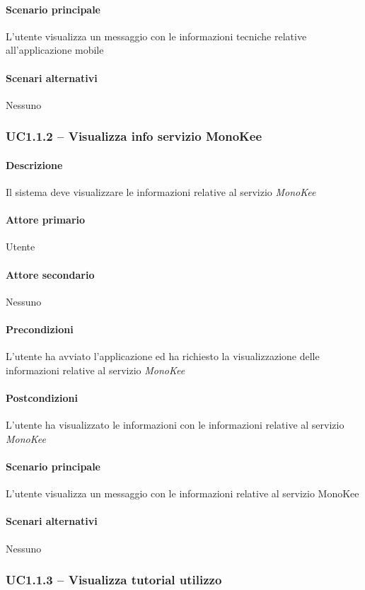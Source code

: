 \paragraph{Scenario principale}  
L’utente visualizza un messaggio con le informazioni tecniche relative all’applicazione mobile
\paragraph{Scenari alternativi}  Nessuno


\subsubsection{UC1.1.2 – Visualizza info servizio MonoKee}
\paragraph{Descrizione}  Il sistema deve visualizzare le informazioni relative al servizio \textit{MonoKee}
\paragraph{Attore primario}  Utente
\paragraph{Attore secondario}  Nessuno
\paragraph{Precondizioni}  L’utente ha avviato l’applicazione ed ha richiesto la visualizzazione delle informazioni relative al servizio \textit{MonoKee}
\paragraph{Postcondizioni}  L’utente ha visualizzato le informazioni con le informazioni relative al servizio \textit{MonoKee}
\paragraph{Scenario principale}  
L’utente visualizza un messaggio con le informazioni relative al servizio MonoKee
\paragraph{Scenari alternativi}  Nessuno


\subsubsection{UC1.1.3 – Visualizza tutorial utilizzo}
